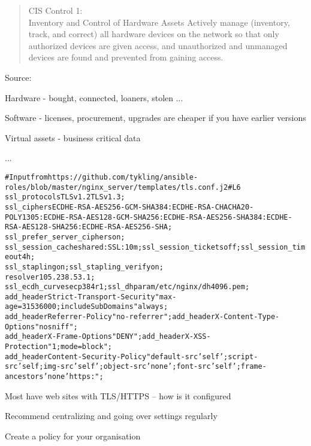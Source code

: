 \documentclass[Screen16to9,17pt]{foils}
\begin{document}
\begin{quote}
CIS Control 1:\\
Inventory and Control of Hardware Assets
Actively manage (inventory, track, and correct) all hardware devices on the network so that only
authorized devices are given access, and unauthorized and unmanaged devices are found and
prevented from gaining access.
\end{quote}
Source: 

\begin{list2}
\item Hardware - bought, connected, loaners, stolen ...
\item Software - licenses, procurement, upgrades are cheaper if you have earlier versions
\item Virtual assets - business critical data
\item ...
\end{list2}




\begin{alltt}\footnotesize
  # Input from https://github.com/tykling/ansible-roles/blob/master/nginx_server/templates/tls.conf.j2#L6
  ssl_protocols                   TLSv1.2 TLSv1.3;
  ssl_ciphers                     ECDHE-RSA-AES256-GCM-SHA384:ECDHE-RSA-CHACHA20-POLY1305:ECDHE-RSA-AES128-GCM-SHA256:ECDHE-RSA-AES256-SHA384:ECDHE-RSA-AES128-SHA256:ECDHE-RSA-AES256-SHA;
  ssl_prefer_server_ciphers       on;
  ssl_session_cache               shared:SSL:10m;     ssl_session_tickets       off;   ssl_session_timeout    4h;
  ssl_stapling                    on;                 ssl_stapling_verify       on;
  resolver                        105.238.53.1;
  ssl_ecdh_curve secp384r1;                           ssl_dhparam /etc/nginx/dh4096.pem;
  add_header Strict-Transport-Security "max-age=31536000; includeSubDomains" always;
  add_header Referrer-Policy "no-referrer";  add_header X-Content-Type-Options "nosniff";
  add_header X-Frame-Options "DENY";  add_header X-XSS-Protection "1; mode=block";
  add_header Content-Security-Policy "default-src 'self'; script-src 'self; img-src 'self'; object-src 'none'; font-src 'self'; frame-ancestors 'none' https:";
\end{alltt}

\begin{list2}
\item Most have web sites with TLS/HTTPS -- how is it configured
\item Recommend centralizing and going over settings regularly
\item Create a policy for your organisation
\end{list2}
\end{document}
